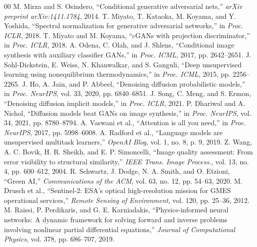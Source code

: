 \documentclass[conference]{IEEEtran}
\begin{document}
\begin{thebibliography}{00}
 M. Mirza and S. Osindero, ``Conditional generative adversarial nets,'' \textit{arXiv preprint arXiv:1411.1784}, 2014.
 T. Miyato, T. Kataoka, M. Koyama, and Y. Yoshida, ``Spectral normalization for generative adversarial networks,'' in \textit{Proc. ICLR}, 2018.
 T. Miyato and M. Koyama, ``cGANs with projection discriminator,'' in \textit{Proc. ICLR}, 2018.
 A. Odena, C. Olah, and J. Shlens, ``Conditional image synthesis with auxiliary classifier GANs,'' in \textit{Proc. ICML}, 2017, pp. 2642--2651.
 J. Sohl-Dickstein, E. Weiss, N. Khanwalkar, and S. Ganguli, ``Deep unsupervised learning using nonequilibrium thermodynamics,'' in \textit{Proc. ICML}, 2015, pp. 2256--2265.
 J. Ho, A. Jain, and P. Abbeel, ``Denoising diffusion probabilistic models,'' in \textit{Proc. NeurIPS}, vol. 33, 2020, pp. 6840--6851.
 J. Song, C. Meng, and S. Ermon, ``Denoising diffusion implicit models,'' in \textit{Proc. ICLR}, 2021.
 P. Dhariwal and A. Nichol, ``Diffusion models beat GANs on image synthesis,'' in \textit{Proc. NeurIPS}, vol. 34, 2021, pp. 8780--8794.
 A. Vaswani et al., ``Attention is all you need,'' in \textit{Proc. NeurIPS}, 2017, pp. 5998--6008.
 A. Radford et al., ``Language models are unsupervised multitask learners,'' \textit{OpenAI Blog}, vol. 1, no. 8, p. 9, 2019.
 Z. Wang, A. C. Bovik, H. R. Sheikh, and E. P. Simoncelli, ``Image quality assessment: From error visibility to structural similarity,'' \textit{IEEE Trans. Image Process.}, vol. 13, no. 4, pp. 600--612, 2004.
 R. Schwartz, J. Dodge, N. A. Smith, and O. Etzioni, ``Green AI,'' \textit{Communications of the ACM}, vol. 63, no. 12, pp. 54--63, 2020.
 M. Drusch et al., ``Sentinel-2: ESA's optical high-resolution mission for GMES operational services,'' \textit{Remote Sensing of Environment}, vol. 120, pp. 25--36, 2012.
 M. Raissi, P. Perdikaris, and G. E. Karniadakis, ``Physics-informed neural networks: A dynamic framework for solving forward and inverse problems involving nonlinear partial differential equations,'' \textit{Journal of Computational Physics}, vol. 378, pp. 686--707, 2019.
\end{thebibliography}
\end{document}
